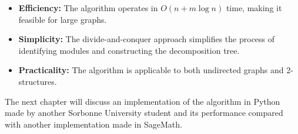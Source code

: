 \begin{itemize}
    \item \textbf{Efficiency:} The algorithm operates in $O(n + m\log{n})$ time, making it feasible for large graphs.
    \item \textbf{Simplicity:} The divide-and-conquer approach simplifies the process of identifying modules and constructing the decomposition tree.
    \item \textbf{Practicality:} The algorithm is applicable to both undirected graphs and 2-structures.
\end{itemize}


\hspace{4cm}

The next chapter will discuss an implementation of the algorithm in Python made by another Sorbonne University student and its performance compared with another implementation made in SageMath.
